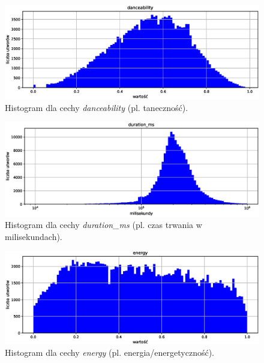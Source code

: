 \documentclass[a4paper,12pt]{article}
\numberwithin{figure}{section}
\begin{document}
    \smallskip

    \begin{figure}[H]
        \centering
        \includegraphics[width=\textwidth]{danceability}
        \caption{Histogram dla cechy \textit{danceability} (pl. taneczność).}
        \label{fig:danceability}
    \end{figure}

    \smallskip

    \begin{figure}[H]
        \centering
        \includegraphics[width=\textwidth]{duration_ms}
        \caption{Histogram dla cechy \textit{duration\_ms} (pl. czas trwania w milisekundach).}
        \label{fig:duration_ms}
    \end{figure}

    \smallskip

    \begin{figure}[H]
        \centering
        \includegraphics[width=\textwidth]{energy}
        \caption{Histogram dla cechy \textit{energy} (pl. energia/energetyczność).}
        \label{fig:energy}
    \end{figure}
\end{document}
